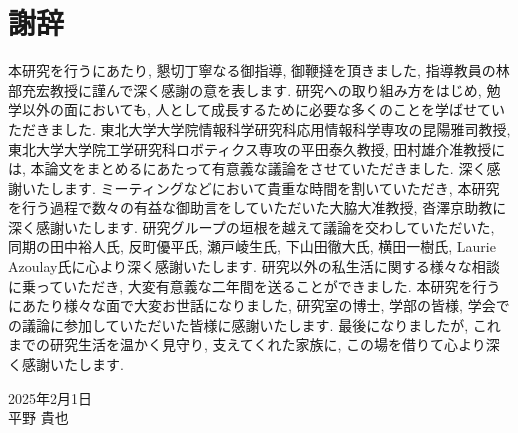 \cleardoublepage %
\chapter*{謝辞}
本研究を行うにあたり, 懇切丁寧なる御指導, 御鞭撻を頂きました, 指導教員の林部充宏教授に謹んで深く感謝の意を表します.
研究への取り組み方をはじめ, 勉学以外の面においても, 人として成長するために必要な多くのことを学ばせていただきました.
東北大学大学院情報科学研究科応用情報科学専攻の昆陽雅司教授, 東北大学大学院工学研究科ロボティクス専攻の平田泰久教授, 田村雄介准教授には, 本論文をまとめるにあたって有意義な議論をさせていただきました.
深く感謝いたします.
ミーティングなどにおいて貴重な時間を割いていただき, 本研究を行う過程で数々の有益な御助言をしていただいた大脇大准教授, 沓澤京助教に深く感謝いたします.
研究グループの垣根を越えて議論を交わしていただいた, 同期の田中裕人氏, 反町優平氏, 瀬戸崚生氏, 下山田徹大氏, 横田一樹氏, Laurie Azoulay氏に心より深く感謝いたします.
研究以外の私生活に関する様々な相談に乗っていただき, 大変有意義な二年間を送ることができました.
本研究を行うにあたり様々な面で大変お世話になりました, 研究室の博士, 学部の皆様, 学会での議論に参加していただいた皆様に感謝いたします.
最後になりましたが, これまでの研究生活を温かく見守り, 支えてくれた家族に, この場を借りて心より深く感謝いたします.

\begin{flushright}
2025年2月1日\\
平野 貴也
\end{flushright}
